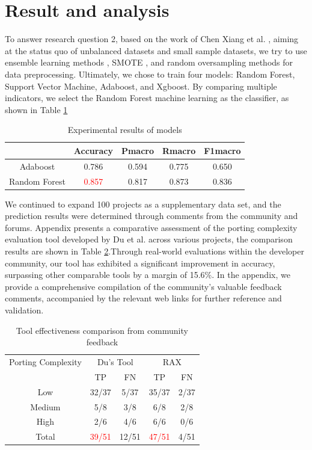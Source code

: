 \documentclass[sigconf,screen,review,anonymous]{acmart}
\begin{document}
\section{Result and analysis}
To answer research question 2, based on the work of Chen Xiang et al. \cite{5128907}, aiming at the status quo of unbalanced datasets and small sample datasets, we try to use ensemble learning methods \cite{6509481}, SMOTE \cite{4271036}, and random oversampling methods for data preprocessing.
Ultimately, we chose to train four models: Random Forest, Support Vector Machine, Adaboost, and Xgboost.
By comparing multiple indicators, we select the Random Forest machine learning as the classifier, as shown in Table \ref{tab:evaluation}

\begin{table}
  \caption{Experimental results of models}
  \label{tab:evaluation}
  \begin{tabular}{ccccc}
    \toprule
     & Accuracy & Pmacro & Rmacro & F1macro \\
    \midrule
    Adaboost & 0.786 & 0.594 & 0.775 & 0.650 \\
    Random Forest & \textcolor{red}{0.857} & 0.817 & 0.873 & 0.836 \\
  \bottomrule
\end{tabular}
\end{table}

We continued to expand 100 projects as a supplementary data set, and the prediction results were determined through comments from the community and forums.
Appendix presents a comparative assessment of the porting complexity evaluation tool developed by Du et al. across various projects, the comparison results are shown in Table \ref{tab:effectiveness}.Through real-world evaluations within the developer community, our tool has exhibited a significant improvement in accuracy, surpassing other comparable tools by a margin of 15.6\%. In the appendix, we provide a comprehensive compilation of the community's valuable feedback comments, accompanied by the relevant web links for further reference and validation.

\begin{table}
  \caption{Tool effectiveness comparison from community feedback}
  \label{tab:effectiveness}
  \begin{tabular}{ccccc}
    \toprule
    Porting Complexity & \multicolumn{2}{c}{Du's Tool} & \multicolumn{2}{c}{RAX} \\
     & TP & FN & TP & FN \\
    \midrule
    Low &32/37 & 5/37 & 35/37 & 2/37 \\
    Medium & 5/8 & 3/8 & 6/8 & 2/8 \\
    High & 2/6 & 4/6 & 6/6 & 0/6 \\
    \midrule
    Total & \textcolor{red}{39/51} & 12/51& \textcolor{red}{47/51} & 4/51 \\
      \bottomrule
\end{tabular}
\end{table}
\end{document}
